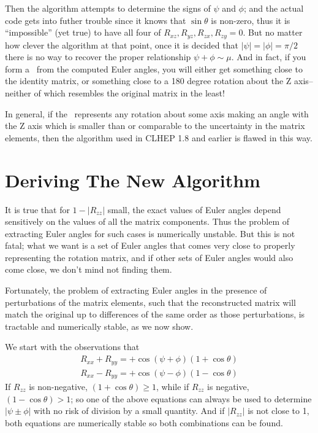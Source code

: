 Then the algorithm attempts to determine the signs of $\psi$ and $\phi$; 
and the actual code gets into futher trouble since it knows that $\sin \theta$
is non-zero, thus it is ``impossible'' (yet true) to have all four of 
$R_{xz}, R_{yz}, R_{zx}, R_{zy} = 0$.  
But no matter how clever the algorithm at that point, once it is decided that
$ |\psi| = |\phi| = \pi /2$ there is no way to recover the proper relationship
$\psi + \phi \sim \mu$.  And in fact, if you form a \Ro\ from the computed
Euler angles, you will either get something close to the identity matrix, or 
something close to a 180 degree 
rotation about the Z axis--neither of which resembles
the original matrix in the least!

In general, if the \Ro\ represents any rotation about some axis making an angle 
with the Z axis which is smaller than or comparable to the uncertainty in the
matrix elements, then the algorithm used in CLHEP 1.8 and earlier is flawed
in this way.

\section{Deriving The New Algorithm}

It is true that for $1 - |R_{zz}|$ small, the exact values of Euler angles 
depend  sensitively on the values of all the matrix components.  Thus
the problem of extracting Euler angles for such cases is numerically unstable.
But this is
not fatal; what we want is a set of Euler angles that comes very close to
properly representing the rotation matrix, 
and if other sets of Euler angles would
also come close, we don't mind not finding them.
 
Fortunately, the problem of extracting Euler angles in the presence of 
perturbations of the matrix elements, such that the reconstructed matrix will 
match the original up to differences of the same order as those perturbations,
is tractable and numerically stable, as we now show.  

We start with the observations that 
\begin{eqnarray}
R_{xx} + R_{yy} = + \cos ( \psi + \phi ) (1 + \cos \theta) \\
R_{xx} - R_{yy} = + \cos ( \psi - \phi ) (1 - \cos \theta) 
\end{eqnarray}
If $R_{zz}$ is non-negative, $(1 + \cos \theta) \geq 1$, while 
if $R_{zz}$ is negative, $(1 - \cos \theta) > 1$; so one of the
above equations can always be used to determine $|\psi \pm \phi|$ with no
risk of division by a small quantity.  And if $|R_{zz}|$ is not close to 1,
both equations are numerically stable so both combinations can be found. 

